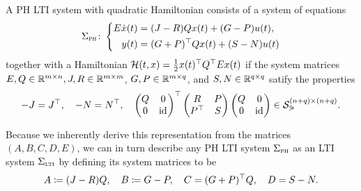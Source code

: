 \begin{definition}\label{def:phlti}
    A \acl{PH} \ac{LTI} system with quadratic Hamiltonian consists of a system of equations
    \begin{equation}\label{eq:phlti}
        \Sigma_{\textnormal{\scshape ph}} \colon \left\lbrace
        \begin{aligned}
            E \dot{x}(t) &= (J - R) Q x(t) + (G - P) u(t), \\
            y(t) &= (G + P)^{\top} Q x(t) + (S - N) u(t)
        \end{aligned}
        \right.
    \end{equation}
    together with a Hamiltonian $\mathcal{H}(t, x) = \frac{1}{2} x(t)^{\top} Q^{\top} E x(t)$ if the system matrices $E, Q \in \mathbb{R}^{m \times n}, J, R \in \mathbb{R}^{m \times m}$, $G, P \in \mathbb{R}^{m \times q}$, and $S, N \in \mathbb{R}^{q \times q}$ satify the properties
    \begin{equation}\label{eq:ph-matrix-structure}
        -J = J^{\top},\quad -N = N^{\top},\quad
        \begin{pmatrix}
            Q & 0 \\
            0 & \text{id}_{}
        \end{pmatrix}^{\top}
        \begin{pmatrix}
            R & P \\
            P^{\top} & S
        \end{pmatrix}
        \begin{pmatrix}
            Q & 0 \\
            0 & \text{id}_{}
        \end{pmatrix}
        \in \mathcal{S}_{\curlyeqsucc}^{(n + q) \times (n + q)}.
    \end{equation}
\end{definition}

\begin{remark}
    Because we inherently derive this representation from the matrices $(A, B, C, D, E)$, we can in turn describe any \ac{PH} \ac{LTI} system $\Sigma_{\textnormal{\scshape ph}}$ as an \ac{LTI} system $\Sigma_{\textnormal{\scshape lti}}$ by defining its system matrices to be
    \begin{equation*}
        A \coloneqq (J - R) Q,\quad B \coloneqq G - P,\quad C = (G + P)^{\top} Q,\quad D = S - N.
    \end{equation*}
\end{remark}

